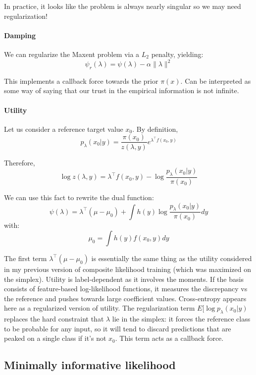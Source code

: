 \documentclass[english]{scrartcl}
\begin{document}
In practice, it looks like the problem is always nearly singular so we may need regularization!

\paragraph{Damping}

We can regularize the Maxent problem via a $L_2$ penalty, yielding:
$$
\psi_r(\lambda) = \psi(\lambda) - \alpha \|\lambda\|^2
$$

This implements a callback force towards the prior $\pi(x)$. Can be interpreted as some way of saying that our trust in the empirical information is not infinite. 


\paragraph{Utility}

Let us consider a reference target value $x_0$. By definition,
$$
p_\lambda(x_0|y) = \frac{\pi(x_0)}{z(\lambda,y)} e^{\lambda^\top f(x_0,y)}
$$

Therefore,
$$
\log z(\lambda,y) = \lambda^\top f(x_0,y) - \log \frac{p_\lambda(x_0|y)}{\pi(x_0)}
$$

We can use this fact to rewrite the dual function:
$$
\psi(\lambda) = \lambda^\top (\mu - \mu_0) + \int h(y) \log \frac{p_\lambda(x_0|y)}{\pi(x_0)} dy
$$
with: 
$$
\mu_0 = \int h(y) f(x_0, y) dy
$$

The first term $\lambda^\top (\mu-\mu_0)$ is essentially the same thing as the utility considered in my previous version of composite likelihood training (which was maximized on the simplex). Utility is label-dependent as it involves the moments. If the basis consists of feature-based log-likelihood functions, it measures the discrepancy vs the reference and pushes towards large coefficient values. Cross-entropy appears here as a regularized version of utility. The regularization term $E[\log p_\lambda(x_0|y)$ replaces the hard constraint that $\lambda$ lie in the simplex: it forces the reference class to be probable for any input, so it will tend to discard predictions that are peaked on a single class if it's not $x_0$. This term acts as a callback force.



\subsection{Minimally informative likelihood}
\end{document}
